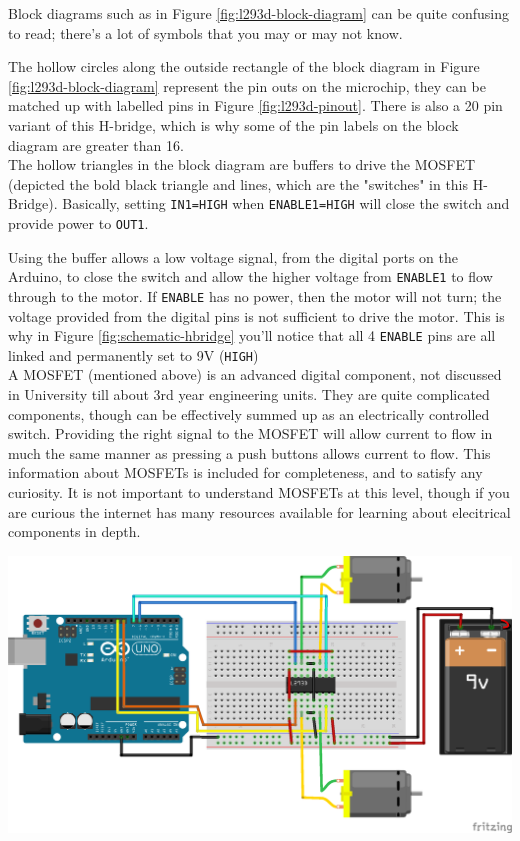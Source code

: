\documentclass[a4paper,12pt]{article}
\begin{document}
Block diagrams such as in Figure \ref{fig:l293d-block-diagram} can be quite confusing to read; there's a lot of symbols that you may or may not know. 

The hollow circles along the outside rectangle of the block diagram in Figure \ref{fig:l293d-block-diagram} represent the pin outs on the microchip, they can be matched up with labelled pins in Figure \ref{fig:l293d-pinout}. There is also a 20 pin variant of this H-bridge, which is why some of the pin labels on the block diagram are greater than 16.\\

The hollow triangles in the block diagram are buffers to drive the MOSFET (depicted the bold black triangle and lines, which are the "switches" in this H-Bridge). Basically, setting \lstinline[]!IN1=HIGH! when \lstinline[]!ENABLE1=HIGH! will close the switch and provide power to \lstinline[]!OUT1!. 

Using the buffer allows a low voltage signal, from the digital ports on the Arduino, to close the switch and allow the higher voltage from \lstinline[]!ENABLE1! to flow through to the motor. If \lstinline[]!ENABLE! has no power, then the motor will not turn; the voltage provided from the digital pins is not sufficient to drive the motor.  This is why in Figure \ref{fig:schematic-hbridge} you'll notice that all 4 \lstinline[]!ENABLE! pins are all linked and permanently set to 9V (\lstinline[]!HIGH!) \\


A MOSFET (mentioned above) is an advanced digital component, not discussed in University till about 3rd year engineering units. They are quite complicated components, though can be effectively summed up as an electrically controlled switch. Providing the right signal to the MOSFET will allow current to flow in much the same manner as pressing a push buttons allows current to flow. This information about MOSFETs is included for completeness, and to satisfy any curiosity. It is not important to understand MOSFETs at this level, though if you are curious the internet has many resources available for learning about elecitrical components in depth. \\

\begin{center}
    \includegraphics[width=\textwidth]{Hbridge_bb.png}
    \label{fig:schematic-hbridge}
\end{center}
\end{document}
